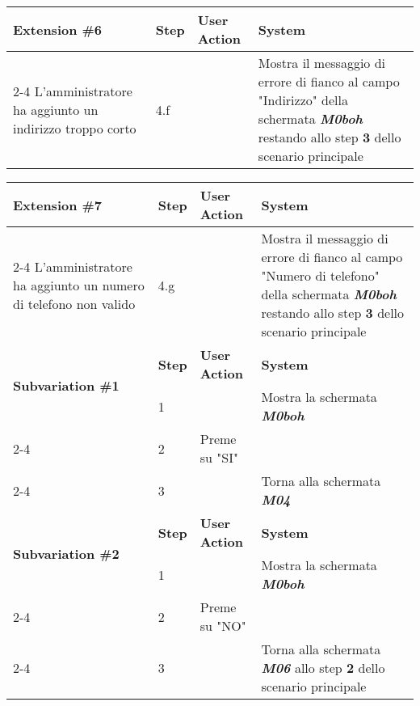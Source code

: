 \begin{table}[H]
\begin{tabularx}{\linewidth}{|X|X|X|X|}
         \hline\multirow{2}{*}{\textbf{Extension \#6}} & \textbf{Step} & \textbf{User Action} & \textbf{System} \\
         \cline{2-4} {L'amministratore ha aggiunto un indirizzo troppo corto} & {4.f} & & {Mostra il messaggio di errore di fianco al campo "Indirizzo" della schermata \textbf{\textit{{M0boh}}} restando allo step \textbf{3} dello scenario principale} \\
         
         \hline
        
        \end{tabularx}
        
        \end{table}
        
        \begin{table}[H]    
    
        \def\arraystretch{1.5}
        
        
        \begin{tabularx}{\linewidth}{|X|X|X|X|}

         
        \hline\multirow{2}{*}{\textbf{Extension \#7}} & \textbf{Step} & \textbf{User Action} & \textbf{System} \\
         \cline{2-4} {L'amministratore ha aggiunto un numero di telefono non valido} & {4.g} & & {Mostra il messaggio di errore di fianco al campo "Numero di telefono" della schermata \textbf{\textit{{M0boh}}} restando allo step \textbf{3} dello scenario principale} \\
         

         \hline \multirow{2}{*}{\textbf{Subvariation \#1}} & \textbf{Step} & \textbf{User Action} & \textbf{System} \\
         \cline{2-4} {L' amministratore torna indietro completando solo parzialmente i campi} & {1} & & {Mostra la schermata \textbf{\textit{M0boh}}} \\
         \cline{2-4} & {2} & {Preme su "SI"} &  \\
         \cline{2-4} & {3} & & {Torna alla schermata \textbf{\textit{M04}}} \\

         
        \hline \multirow{2}{*}{\textbf{Subvariation \#2}} & \textbf{Step} & \textbf{User Action} & \textbf{System} \\
         \cline{2-4} {L' amministratore inizialmente vuole tornare indietro completando solo parzialmente i campi ma cambia idea} & {1} & & {Mostra la schermata \textbf{\textit{M0boh}}} \\
         \cline{2-4} & {2} & {Preme su "NO"} &  \\
         \cline{2-4} & {3} & & {Torna alla schermata \textbf{\textit{M06}} allo step \textbf{2} dello scenario principale} \\
        \hline       
        
        \end{tabularx}
        
        \end{table} 

